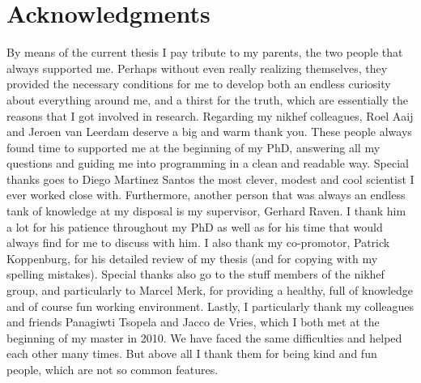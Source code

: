 \chapter*{Acknowledgments}
\chaptermark{}

By means of the current thesis I pay tribute to my parents, the two people that always
supported me. Perhaps without even really realizing themselves, they provided the necessary conditions
for me to develop both an endless curiosity about everything around me, and a thirst for the truth,
which are essentially the reasons that I got involved in research. Regarding my nikhef colleagues,
Roel Aaij and Jeroen van Leerdam deserve a big and warm thank you. These people always found time to
supported me at the beginning of my PhD, answering all my questions and guiding me into programming in
a clean and readable way. Special thanks goes to Diego Martinez Santos the most clever, modest
and cool scientist I ever worked close with. Furthermore, another person that was always an endless
tank of knowledge at my disposal is my supervisor, Gerhard Raven. I thank him a lot for his patience
throughout my PhD as well as for his time that would always find for me to discuss with him.
I also thank my co-promotor, Patrick Koppenburg, for his detailed review of my thesis (and for
copying with my spelling mistakes). Special thanks also go to the stuff members of the nikhef
\lhcb group, and particularly to Marcel Merk, for providing a healthy, full of knowledge and of
course fun working environment. Lastly, I particularly thank my colleagues and friends Panagiwti
Tsopela and Jacco de Vries, which I both met at the beginning of my master in 2010. We have
faced the same difficulties and helped each other many times. But above all I thank them for
being kind and fun people, which are not so common features.
